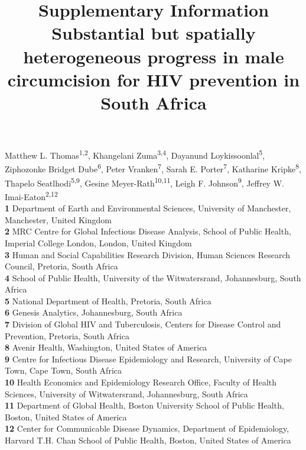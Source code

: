 \documentclass{article}
\title{Supplementary Information\\[5pt] Substantial but spatially heterogeneous progress in male circumcision for HIV prevention in South Africa}
\author{}
\date{}
\begin{document}

\maketitle

\vspace{-1.5cm}

Matthew L. Thomas\textsuperscript{1,2},
Khangelani Zuma\textsuperscript{3,4},
Dayanund Loykissoonlal\textsuperscript{5},
Ziphozonke Bridget Dube\textsuperscript{6},
Peter Vranken\textsuperscript{7},
Sarah E. Porter\textsuperscript{7},
Katharine Kripke\textsuperscript{8},
Thapelo Seatlhodi\textsuperscript{5,9},
Gesine Meyer-Rath\textsuperscript{10,11},
Leigh F. Johnson\textsuperscript{9},
Jeffrey W. Imai-Eaton\textsuperscript{2,12} \\
  
\textbf{1} Department of Earth and Environmental Sciences, University of Manchester, Manchester, United Kingdom\\
\textbf{2} MRC Centre for Global Infectious Disease Analysis, School of Public Health, Imperial College London, London, United Kingdom\\
\textbf{3} Human and Social Capabilities Research Division, Human Sciences Research Council,  Pretoria, South Africa\\
\textbf{4} School of Public Health, University of the Witwatersrand, Johannesburg, South Africa\\
\textbf{5} National Department of Health, Pretoria, South Africa\\
\textbf{6} Genesis Analytics, Johannesburg, South Africa\\
\textbf{7} Division of Global HIV and Tuberculosis, Centers for Disease Control and Prevention, Pretoria, South Africa\\
\textbf{8} Avenir Health, Washington, United States of America\\
\textbf{9} Centre for Infectious Disease Epidemiology and Research, University of Cape Town, Cape Town, South Africa \\
\textbf{10} Health Economics and Epidemiology Research Office, Faculty of Health Sciences, University of Witwatersrand, Johannesburg, South Africa\\
\textbf{11} Department of Global Health, Boston University School of Public Health, Boston, United States of America\\
\textbf{12} Center for Communicable Disease Dynamics, Department of Epidemiology, Harvard T.H. Chan School of Public Health, Boston, United States of America\\
\newpage
\end{document}
